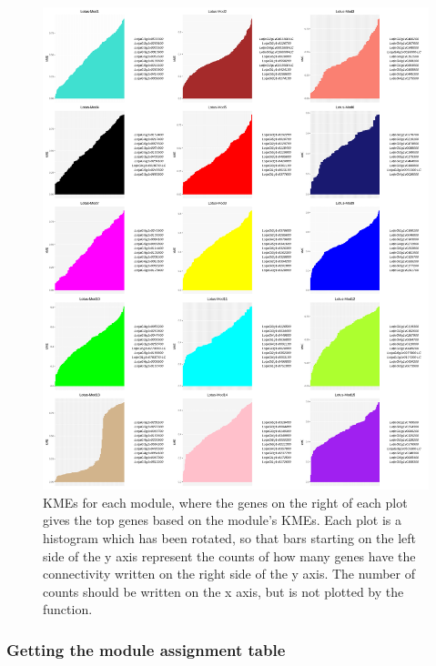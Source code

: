 \documentclass[
  letterpaper,
  DIV=11,
  numbers=noendperiod]{scrartcl}
\begin{document}
\begin{figure}[H]

{\centering \includegraphics{notebook_files/figure-pdf/fig-kme-output-1.png}

}

\caption{\label{fig-kme}KMEs for each module, where the genes on the
right of each plot gives the top genes based on the module's KMEs. Each
plot is a histogram which has been rotated, so that bars starting on the
left side of the y axis represent the counts of how many genes have the
connectivity written on the right side of the y axis. The number of
counts should be written on the x axis, but is not plotted by the
function.}

\end{figure}

\hypertarget{getting-the-module-assignment-table}{%
\subsubsection{Getting the module assignment
table}\label{getting-the-module-assignment-table}}
\end{document}
